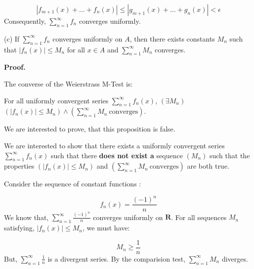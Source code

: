\documentclass[10pt]{article}
\begin{document}
\begin{equation*}
|f_{m+1}( x) +\dotsc +f_{n}( x) |\leq |g_{m+1}( x) +\dotsc +g_{n}( x) |< \epsilon 
\end{equation*}
Consequently, $\displaystyle \sum _{n=1}^{\infty } f_{n}$ converges uniformly.



(c) If $\displaystyle \sum _{n=1}^{\infty } f_{n}$ converges uniformly on $\displaystyle A$, then there exists constants $\displaystyle M_{n}$ such that $\displaystyle |f_{n}( x) |\leq M_{n}$ for all $\displaystyle x\in A$ and $\displaystyle \sum _{n=1}^{\infty } M_{n}$ converges.



\textbf{Proof.}



The converse of the Weierstrass M-Test is:



For all uniformly convergent series $\displaystyle \sum _{n=1}^{\infty } f_{n}( x)$, $(\exists M_{n} )$ $\displaystyle ( |f_{n}( x) |\leq M_{n}) \land \left(\sum _{n=1}^{\infty } M_{n} \ \text{converges}\right)$. \ 



We are interested to prove, that this proposition is false.



We are interested to show that there exists a uniformly convergent series \ $\displaystyle \sum _{n=1}^{\infty } f_{n}( x)$ such that there \textbf{does not exist a }sequence $\displaystyle ( M_{n})$ such that the properties $\displaystyle ( |f_{n}( x) |\leq M_{n})$ and $\displaystyle \left(\sum _{n=1}^{\infty } M_{n} \ \text{converges}\right)$ are both true.



Consider the sequence of constant functions :


\begin{equation*}
f_{n}( x) =\frac{( -1)^{n}}{n}
\end{equation*}
We know that, $\displaystyle \sum _{n=1}^{\infty }\frac{( -1)^{n}}{n}$ converges uniformly on $\displaystyle \mathbf{R}$. For all sequences $\displaystyle M_{n}$ satisfying, $\displaystyle |f_{n}( x) |\leq M_{n}$, we must have:


\begin{equation*}
M_{n} \geq \frac{1}{n}
\end{equation*}
But, $\displaystyle \sum _{n=1}^{\infty }\frac{1}{n}$ is a divergent series. By the comparision test, $\displaystyle \sum _{n=1}^{\infty } M_{n}$ diverges.
\end{document}
